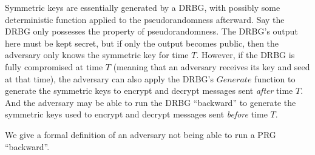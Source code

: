 \documentclass[12pt,lot, lof]{puthesis}
\begin{document}
Symmetric keys are essentially generated by a DRBG, with possibly some deterministic function applied to the pseudorandomness afterward. Say the DRBG only possesses the property of pseudorandomness. The DRBG's output here must be kept secret, but if only the output becomes public, then the adversary only knows the symmetric key for time $T$. However, if the DRBG is fully compromised at time $T$ (meaning that an adversary receives its key and seed at that time), the adversary can also apply the DRBG's $Generate$ function to generate the symmetric keys to encrypt and decrypt messages sent \emph{after} time $T$. And the adversary may be able to run the DRBG ``backward'' to generate the symmetric keys used to encrypt and decrypt messages sent \emph{before} time $T$.

We give a formal definition of an adversary not being able to run a PRG ``backward''.
\end{document}
